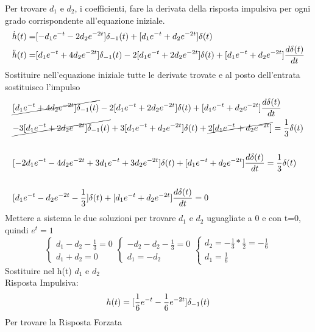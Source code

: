 		Per trovare $d_1$ e $d_2$, i coefficienti, fare la derivata della risposta impulsiva per ogni grado corrispondente all'equazione iniziale.\\
		\[
		\begin{split}
		\dot{h}(t) =& [-d_1e^{-t}-2d_2e^{-2t}]\delta_{-1}(t)+[d_1e^{-t}+d_2e^{-2t}]\delta(t)\\
		\ddot{h}(t) =& [d_1e^{-t}+4d_2e^{-2t}]\delta_{-1}(t)-2[d_1e^{-t}+2d_2e^{-2t}]\delta(t)+[d_1e^{-t}+d_2e^{-2t}]\frac{d\delta(t)}{dt}\\
		\end{split}
		\]
		Sostituire nell'equazione iniziale tutte le derivate trovate e al posto dell'entrata sostituisco l'impulso
		\[
		\begin{split}
		&\cancel{[d_1e^{-t}+4d_2e^{-2t}]\delta_{-1}(t)}
		-2[d_1e^{-t}+2d_2e^{-2t}]\delta(t)+[d_1e^{-t}+d_2e^{-2t}]\frac{d\delta(t)}{dt}\\
		&\cancel{-3[d_1e^{-t}+2d_2e^{-2t}]\delta_{-1}(t)}+3[d_1e^{-t}+d_2e^{-2t}]\delta(t)+\cancel{2[d_1e^{-t} + d_2e^{-2t}]}  = \frac{1}{3}\delta(t)\\
		\\
		&[-2d_1e^{-t}-4d_2e^{-2t}+3d_1e^{-t}+3d_2e^{-2t}]\delta(t)+[d_1e^{-t}+d_2e^{-2t}]\frac{d\delta(t)}{dt} = \frac{1}{3}\delta(t)\\
		\\
		&[d_1e^{-t}-d_2e^{-2t}-\frac{1}{3}]\delta(t)+[d_1e^{-t}+d_2e^{-2t}]\frac{d\delta(t)}{dt}=0
		\end{split}
		\]
		Mettere a sistema le due soluzioni per trovare $d_1$ e $d_2$ uguagliate a 0 e con t=0, quindi $e^t = 1$
		\[
		\begin{cases}
		d_1-d_2-\frac{1}{3} = 0\\
		d_1+d_2 = 0
		\end{cases}
		\begin{cases}
		-d_2-d_2-\frac{1}{3} = 0\\
		d_1 = -d_2
		\end{cases}
		\begin{cases}
		d_2=-\frac{1}{3}*\frac{1}{2} = -\frac{1}{6}\\
		d_1 = \frac{1}{6}
		\end{cases}
		\]
		Sostituire nel h(t) $d_1$ e $d_2$\\
		Risposta Impulsiva:
		\[
		h(t)=[\frac{1}{6}e^{-t}-\frac{1}{6}e^{-2t}]\delta_{-1}(t)
		\]
		Per trovare la Risposta Forzata\\
